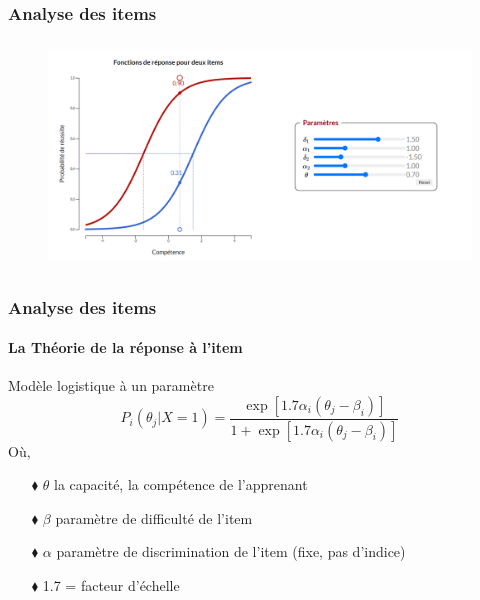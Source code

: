 \documentclass[aspectratio=169,professionalfonts, 12pt]{beamer}
\begin{document}
\begin{frame}
  \frametitle{Analyse des items}
  \justifying 
  \begin{minipage}{\textwidth}
  \begin{figure}[H]
      \includegraphics[height=6cm]{images/etat_art/rasch_figure.png}
  \end{figure}
  \end{minipage}
\end{frame}


\begin{frame}
  \frametitle{Analyse des items}
  \framesubtitle{La Théorie de la réponse à l'item}
  \justifying
  \begin{minipage}{\textwidth}
  \begin{block}{Modèle logistique à un paramètre}
    \begin{equation}
      P_{i}(\theta_{j} | X=1) = \frac{\exp \left[ 1.7 \alpha_{i}(\theta_{j}-\beta_{i}) \right]  }{1+ \exp \left[1.7 \alpha_{i}(\theta_{j}-\beta_{i}) \right]  } 
    \end{equation}
    Où, \\
    \begin{itemize}
      \item[$\blacklozenge$] \(\displaystyle \theta \) la capacité, la compétence de l'apprenant 
      \item[$\blacklozenge$] \(\displaystyle \beta \) paramètre de difficulté de l'item
      \item[$\blacklozenge$] \(\displaystyle \alpha \) paramètre de discrimination de l'item (fixe, pas d'indice)
      \item[$\blacklozenge$] 1.7 =  facteur d'échelle
    \end{itemize}
  \end{block}  
  \end{minipage} 
\end{frame}
\end{document}
